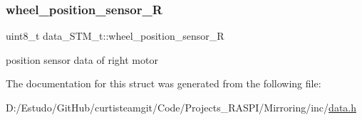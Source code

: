 \subsubsection{\texorpdfstring{wheel\+\_\+position\+\_\+sensor\+\_\+R}{wheel\_position\_sensor\_R}}
{\footnotesize\ttfamily uint8\+\_\+t data\+\_\+\+S\+T\+M\+\_\+t\+::wheel\+\_\+position\+\_\+sensor\+\_\+R}

position sensor data of right motor 

The documentation for this struct was generated from the following file\+:\begin{DoxyCompactItemize}
\item 
D\+:/\+Estudo/\+Git\+Hub/curtisteamgit/\+Code/\+Projects\+\_\+\+R\+A\+S\+P\+I/\+Mirroring/inc/\hyperlink{data_8h}{data.\+h}\end{DoxyCompactItemize}
